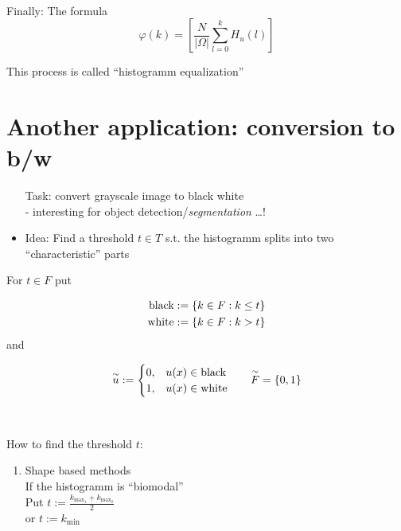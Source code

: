 ~\par
Finally: The formula
	$$ \varphi(k) = \left[ \frac {N} {|\Omega|} 
	\sum_{l=0}^{k} H_u (l) \right]$$

This process is called \enquote{histogramm equalization}


\section{Another application: conversion to b/w}	

\begin{itemize}[]
  \item [Task:] convert grayscale image to black white\\
	- interesting for object detection/\emph{segmentation} \dots !
	\item Idea: Find a threshold $t\in T$ s.t. the histogramm splits
		into two \enquote{characteristic} parts
\end{itemize}

\begin{minipage}{\linewidth}
 	\tikzpictureQTWELVEONE 
\end{minipage}

For $t\in F$ put 

$$\begin{aligned}
	\text{black} &	:= \left\{k\in F: k \le t\right\} \\
	\text{white} & 	:= \left\{k\in F: k > t\right\} \\
\end{aligned}$$
and 


$$ \begin{aligned}
		\overset{\sim}{u} & :=		
			\begin{cases}
				0, & u(x) \in \text{black} \\
				1, & u(x) \in \text{white}
			\end{cases}
			& \quad \overset{\sim}{F} = \left\{0,1\right\} 
\end{aligned} $$

~\par

How to find the threshold $t$: 
\begin{enumerate}[1.)]
  \item%
	\begin{minipage}[t]{0.6\linewidth}
	  Shape based methods\\
		If the histogramm is \enquote{biomodal}\\
		Put $ \displaystyle t:= \frac {k_{\max_1} + k_{\max_2}} {2}$\\
		or $\displaystyle t:= k_{\min}$
	\end{minipage} 
\end{enumerate}


